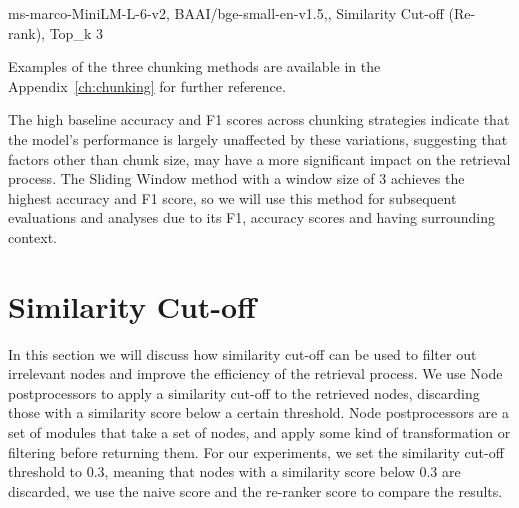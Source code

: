 \begin{table}[h!]
    \centering
    \noindent
    {\scriptsize ms-marco-MiniLM-L-6-v2, BAAI/bge-small-en-v1.5,, Similarity Cut-off (Re-rank), Top\_k 3}
    \caption{Evaluation Results for Different Chunking Strategies through the Pipeline (just with the Gemma2 model)}
    \label{tab:table_chunking}
\end{table}
Examples of the three chunking methods are available in the Appendix~\ref{ch:chunking} for further reference.

The high baseline accuracy and F1 scores across chunking strategies indicate that the model’s performance is largely unaffected by these variations, suggesting that factors other than chunk size, may have a more significant impact on the retrieval process.
The Sliding Window method with a window size of 3 achieves the highest accuracy and F1 score, so we will use this method for subsequent evaluations and analyses due to its F1, accuracy scores and having surrounding context.

\section{Similarity Cut-off}\label{sec:similar-cut-off}
In this section we will discuss how similarity cut-off can be used to filter out irrelevant nodes and improve the efficiency of the retrieval process.
We use Node postprocessors to apply a similarity cut-off to the retrieved nodes, discarding those with a similarity score below a certain threshold.
Node postprocessors are a set of modules that take a set of nodes, and apply some kind of transformation or filtering before returning them.
For our experiments, we set the similarity cut-off threshold to 0.3, meaning that nodes with a similarity score below 0.3 are discarded, we use the naive score and the re-ranker score to compare the results.

